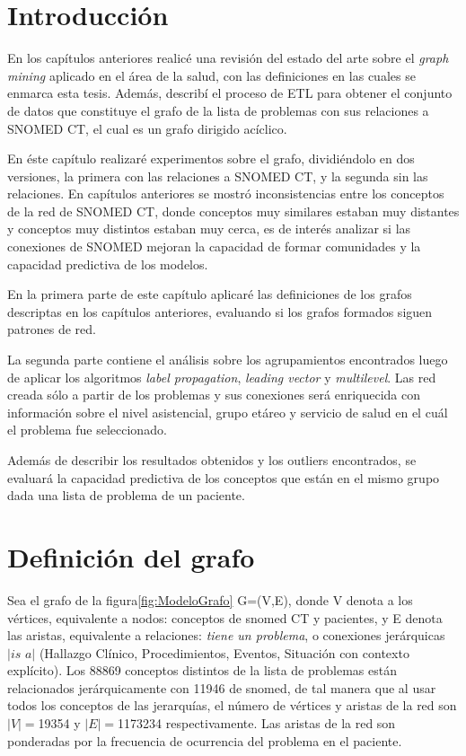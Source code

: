 \section{Introducción}
En los capítulos anteriores realicé una revisión del estado del arte sobre el \textit{graph mining} aplicado en el área de la salud, con las definiciones en las cuales se enmarca esta tesis. Además, describí el proceso de ETL para obtener el conjunto de datos que constituye el grafo de la lista de problemas con sus relaciones a SNOMED CT, el cual es un grafo dirigido acíclico.

En éste capítulo realizaré experimentos sobre el grafo, dividiéndolo en dos versiones, la primera con las relaciones a SNOMED CT, y la segunda sin las relaciones. En capítulos anteriores se mostró inconsistencias entre los conceptos de la red de SNOMED CT, donde conceptos muy similares estaban muy distantes y conceptos muy distintos estaban muy cerca, es de interés analizar si las conexiones de SNOMED mejoran la capacidad de formar comunidades y la capacidad predictiva de los modelos.

En la primera parte de este capítulo aplicaré las definiciones de los grafos descriptas en los capítulos anteriores, evaluando si los grafos formados siguen patrones de red. 

La segunda parte contiene el análisis sobre los agrupamientos encontrados luego de aplicar los algoritmos \textit{label propagation}, \textit{leading vector} y \textit{multilevel}. Las red creada sólo a partir de los problemas y sus conexiones será enriquecida con información sobre el nivel asistencial, grupo etáreo y servicio de salud en el cuál el problema fue seleccionado. 

Además de describir los resultados obtenidos y los outliers encontrados, se evaluará la capacidad predictiva de los conceptos que están en el mismo grupo dada una lista de problema de un paciente.

\section{Definición del grafo}
Sea el grafo de la figura\ref{fig:ModeloGrafo} G=(V,E), donde V denota a los vértices, equivalente a nodos: conceptos de snomed CT y pacientes, y E denota las aristas, equivalente a relaciones: \textit{tiene un problema}, o conexiones jerárquicas $|\textit{is a}|$ (Hallazgo Clínico, Procedimientos, Eventos, Situación con contexto explícito). Los \num{88869} conceptos distintos de la lista de problemas están relacionados jerárquicamente con \num{11946} de snomed, de tal manera que al usar todos los conceptos de las jerarquías, el número de vértices y aristas de la red son $|V|=$\num{19354} y $|E|=$\num{1173234} respectivamente. Las aristas de la red son ponderadas por la frecuencia de ocurrencia del problema en el paciente. 

